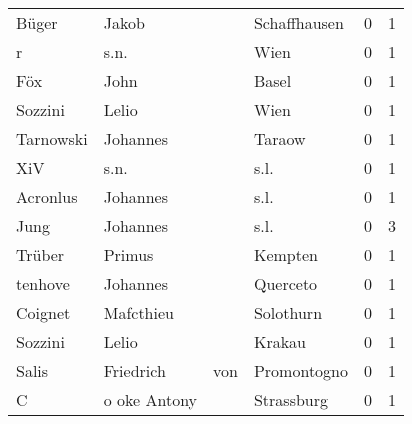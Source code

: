 \begin{center}
\begin{tiny}
\begin{longtabu}{llllrr}
                    Büger &                              Jakob &             &                                Schaffhausen &          0 &         1 \\
                        r &                               s.n. &             &                                        Wien &          0 &         1 \\
                      Föx &                               John &             &                                       Basel &          0 &         1 \\
                  Sozzini &                              Lelio &             &                                        Wien &          0 &         1 \\
                Tarnowski &                           Johannes &             &                                      Taraow &          0 &         1 \\
                      XiV &                               s.n. &             &                                        s.l. &          0 &         1 \\
                 Acronlus &                           Johannes &             &                                        s.l. &          0 &         1 \\
                     Jung &                           Johannes &             &                                        s.l. &          0 &         3 \\
                   Trüber &                             Primus &             &                                     Kempten &          0 &         1 \\
                  tenhove &                           Johannes &             &                                    Querceto &          0 &         1 \\
                  Coignet &                          Mafcthieu &             &                                   Solothurn &          0 &         1 \\
                  Sozzini &                              Lelio &             &                                      Krakau &          0 &         1 \\
                    Salis &                          Friedrich &         von &                                 Promontogno &          0 &         1 \\
                        C &                       o oke Antony &             &                                  Strassburg &          0 &         1 \\

\end{longtabu}
\end{tiny}
\end{center}
